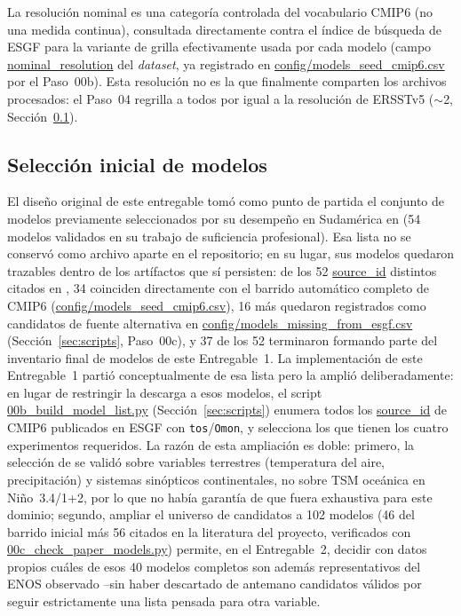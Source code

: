 \documentclass[11pt,a4paper]{article}
\newcommand{\archivo}[1]{\begingroup\hypersetup{urlcolor=black}\url{#1}\endgroup}
\begin{document}
La resoluci\'on nominal es una categor\'ia controlada del vocabulario CMIP6 (no una medida continua), consultada directamente contra el \'indice de b\'usqueda de ESGF para la variante de grilla efectivamente usada por cada modelo (campo \archivo{nominal_resolution} del \emph{dataset}, ya registrado en \archivo{config/models_seed_cmip6.csv} por el Paso~00b). Esta resoluci\'on no es la que finalmente comparten los archivos procesados: el Paso~04 regrilla a todos por igual a la resoluci\'on de ERSSTv5 ($\sim$2\textdegree, Secci\'on~\ref{sec:desviacion}).

\subsection{Selecci\'on inicial de modelos}
\label{sec:desviacion}

El dise\~no original de este entregable tom\'o como punto de partida el conjunto de modelos previamente seleccionados por su desempe\~no en Sudam\'erica en \citet{bruno2023} (54 modelos validados en su trabajo de suficiencia profesional). Esa lista no se conserv\'o como archivo aparte en el repositorio; en su lugar, sus modelos quedaron trazables dentro de los art\'ifactos que s\'i persisten: de los 52 \archivo{source_id} distintos citados en \citet{bruno2023}, 34 coinciden directamente con el barrido autom\'atico completo de CMIP6 (\archivo{config/models_seed_cmip6.csv}), 16 m\'as quedaron registrados como candidatos de fuente alternativa en \archivo{config/models_missing_from_esgf.csv} (Secci\'on~\ref{sec:scripts}, Paso~00c), y 37 de los 52 terminaron formando parte del inventario final de modelos de este Entregable~1. La implementaci\'on de este Entregable~1 parti\'o conceptualmente de esa lista pero la ampli\'o deliberadamente: en lugar de restringir la descarga a esos modelos, el script \archivo{00b_build_model_list.py} (Secci\'on~\ref{sec:scripts}) enumera todos los \archivo{source_id} de CMIP6 publicados en ESGF con \texttt{tos}/\texttt{Omon}, y selecciona los que tienen los cuatro experimentos requeridos. La raz\'on de esta ampliaci\'on es doble: primero, la selecci\'on de \citet{bruno2023} se valid\'o sobre variables terrestres (temperatura del aire, precipitaci\'on) y sistemas sin\'opticos continentales, no sobre TSM oce\'anica en Ni\~no~3.4/1+2, por lo que no hab\'ia garant\'ia de que fuera exhaustiva para este dominio; segundo, ampliar el universo de candidatos a 102 modelos (46 del barrido inicial m\'as 56 citados en la literatura del proyecto, verificados con \archivo{00c_check_paper_models.py}) permite, en el Entregable~2, decidir con datos propios cu\'ales de esos 40 modelos completos son adem\'as representativos del ENOS observado --sin haber descartado de antemano candidatos v\'alidos por seguir estrictamente una lista pensada para otra variable.
\end{document}
